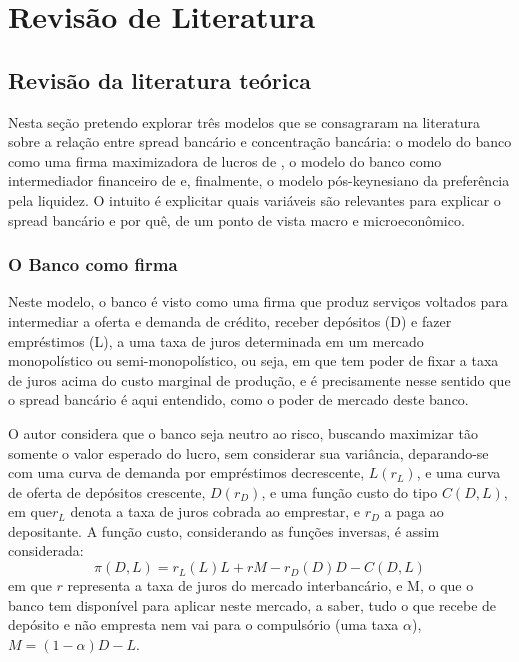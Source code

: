 \documentclass[a4paper, 12pt, openany, oneside, brazil]{abntex2}
\begin{document}
\imprimircapa
\imprimirfolhaderosto

\tableofcontents*
\cleardoublepage

\textual


\chapter{Revisão de Literatura}
\section{Revisão da literatura teórica}

    Nesta seção pretendo explorar três modelos que se consagraram na literatura
    sobre a relação entre spread bancário e concentração bancária: o modelo do
    banco como uma firma maximizadora de lucros de , o modelo
    do banco como intermediador financeiro de  e,
    finalmente, o modelo pós-keynesiano da preferência pela liquidez. O intuito
    é explicitar quais variáveis são relevantes para explicar o spread bancário
    e por quê, de um ponto de vista macro e microeconômico.

\subsection{O Banco como firma}

    Neste modelo, o banco é visto como uma firma que produz serviços voltados
    para intermediar a oferta e demanda de crédito, receber depósitos (D) e
    fazer empréstimos (L), a uma taxa de juros determinada em um mercado
    monopolístico ou semi-monopolístico, ou seja, em que tem poder de fixar a
    taxa de juros acima do custo marginal de produção, e é precisamente nesse
    sentido que o spread bancário é aqui entendido, como o poder de mercado
    deste banco. \cite{oreiro}

    O autor considera que o banco seja neutro ao risco, buscando maximizar tão
    somente o valor esperado do lucro, sem considerar sua variância,
    deparando-se com uma curva de demanda por empréstimos decrescente, $L(r_L)$,
    e uma curva de oferta de depósitos crescente, $D(r_D)$, e uma função custo
    do tipo $C(D, L)$, em que$ r_L$ denota a taxa de juros cobrada ao emprestar,
    e $r_D$ a paga ao depositante. A função custo, considerando as funções
    inversas, é assim considerada: \begin{equation}\pi(D, L) = r_L(L)L + rM -
    r_D(D)D - C(D, L)\end{equation} em que $r$ representa a taxa de juros do
    mercado interbancário, e M, o que o banco tem disponível para aplicar neste
    mercado, a saber, tudo o que recebe de depósito e não empresta nem vai para
    o compulsório (uma taxa $\alpha$), $M = (1 - \alpha)D - L$.
\end{document}

